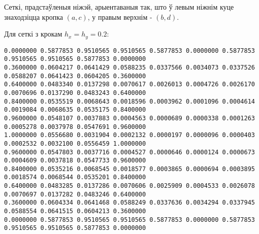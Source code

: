 Сеткі, прадстаўленыя ніжэй, арыентаваныя так, што ў левым ніжнім куце знаходзіцца кропка $(a, c)$, у правым верхнім - $(b, d)$.\par
\vspace{5mm}

Для сеткі з крокам $h_x = h_y = 0.2$:
{\footnotesize
\begin{verbatim}
0.0000000 0.5877853 0.9510565 0.9510565 0.5877853 0.0000000 0.5877853 0.9510565 0.9510565 0.5877853 0.0000000
0.3600000 0.0604217 0.0641429 0.0588235 0.0337566 0.0034073 0.0337526 0.0588207 0.0641423 0.0604205 0.3600000
0.6400000 0.0483340 0.0137298 0.0070617 0.0026013 0.0004726 0.0026170 0.0070696 0.0137290 0.0483243 0.6400000
0.8400000 0.0535519 0.0068643 0.0018596 0.0003962 0.0001096 0.0004614 0.0019084 0.0068635 0.0535175 0.8400000
0.9600000 0.0548107 0.0037883 0.0004563 0.0000689 0.0000338 0.0001263 0.0005278 0.0037978 0.0547691 0.9600000
1.0000000 0.0556680 0.0031904 0.0002132 0.0000197 0.0000096 0.0000403 0.0002532 0.0032100 0.0556459 1.0000000
0.9600000 0.0547803 0.0037716 0.0004527 0.0000646 0.0000124 0.0000673 0.0004609 0.0037818 0.0547733 0.9600000
0.8400000 0.0535216 0.0068545 0.0018577 0.0003865 0.0000694 0.0003895 0.0018574 0.0068544 0.0535201 0.8400000
0.6400000 0.0483285 0.0137286 0.0070606 0.0025909 0.0004533 0.0026078 0.0070697 0.0137282 0.0483246 0.6400000
0.3600000 0.0604334 0.0641468 0.0588249 0.0337636 0.0034294 0.0337945 0.0588554 0.0641515 0.0604213 0.3600000
0.0000000 0.5877853 0.9510565 0.9510565 0.5877853 0.0000000 0.5877853 0.9510565 0.9510565 0.5877853 0.0000000
\end{verbatim}
}

